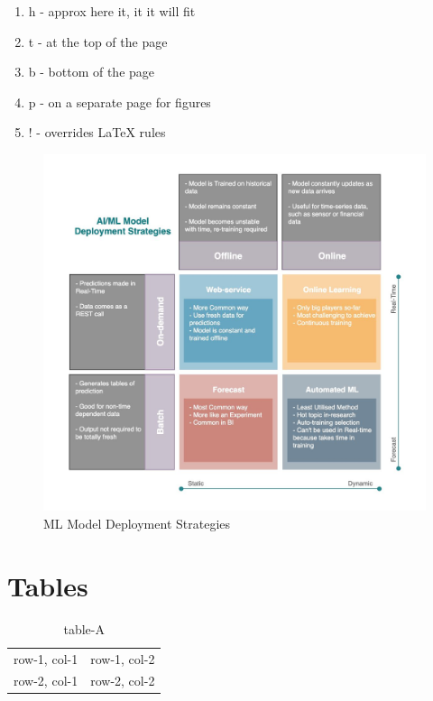 \documentclass[a4paper,12pt]{article}
\begin{document}
\begin{enumerate}
\item h - approx here it, it it will fit
\item t - at the top of the page
\item b - bottom of the page
\item p - on a separate page for figures
\item ! - overrides LaTeX rules
\end{enumerate}

\begin{figure}[H]
\centering
\includegraphics[width=1\textwidth]{images/ml-model-deployment-strategies.jpg}
\caption{ML Model Deployment Strategies}
\label{flask-rq-flow}
\end{figure}



\section{Tables}

\begin{table}[H]
\centering
\begin{tabular}{|l|l|}
row-1, col-1 & row-1, col-2 \\
row-2, col-1 & row-2, col-2 \\
\end{tabular}
\caption{table-A}
\end{table}
\end{document}
